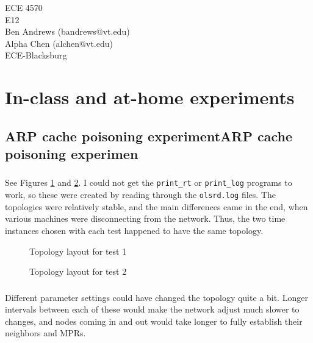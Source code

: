 \documentclass[11pt]{article}
\begin{document}
\begin{flushright}
{ECE 4570}\\{E12}\\{Ben Andrews (bandrews@vt.edu)}\\{Alpha Chen (alchen@vt.edu)}\\{ECE-Blacksburg}\end{flushright}

\section{In-class and at-home experiments}

\subsection{ARP cache poisoning experimentARP cache poisoning experimen}

\subsubsection{}

See Figures \ref{topology_1} and \ref{topology_2}. I could not get the \verb|print_rt| or \verb|print_log| programs to work, so these were created by reading through the \verb|olsrd.log| files. The topologies were relatively stable, and the main differences came in the end, when various machines were disconnecting from the network. Thus, the two time instances chosen with each test happened to have the same topology.

\begin{figure}[hp]
	\caption{Topology layout for test 1}
	\label{topology_1}
\end{figure}

\begin{figure}[hp]
	\caption{Topology layout for test 2}
	\label{topology_2}
\end{figure}

\subsubsection{}

Different parameter settings could have changed the topology quite a bit. Longer intervals between each of these would make the network adjust much slower to changes, and nodes coming in and out would take longer to fully establish their neighbors and MPRs.
\end{document}
